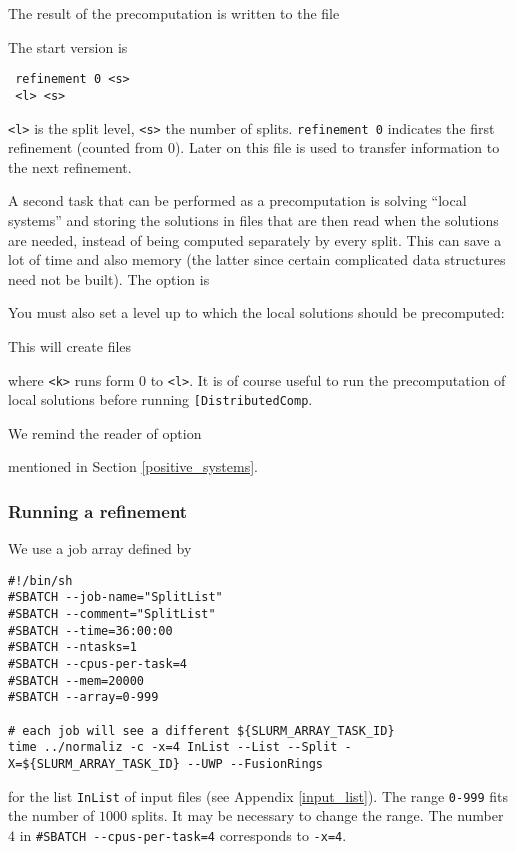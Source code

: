  The result of the precomputation is written to the file
 \begin{itemize}
 \end{itemize}
The start version is
 \begin{Verbatim}
 refinement 0 <s>
 <l> <s>
 \end{Verbatim}
 \verb*|<l>| is the split level, \verb*|<s>| the number of splits. \verb*|refinement 0| indicates the first refinement (counted from $0$). Later on this file is used to transfer information to the next refinement.

A second task that can be performed as a precomputation is solving ``local systems'' and storing the solutions in files that are then read when the solutions are needed, instead of being computed separately by every split. This can save a lot of time and also memory (the latter since certain complicated data structures need not be built). The option is
\begin{itemize}
\end{itemize}
You must also set a level up to which the local solutions should be precomputed:
\begin{itemize}
\end{itemize}
This will create files
\begin{itemize}
\end{itemize}
where \verb*|<k>| runs form $0$ to \verb*|<l>|. It is of course useful to run the precomputation of local solutions before running \verb*|[DistributedComp|.

We remind the reader of  option
\begin{itemize}
	\itemtt[ShortInt]
\end{itemize}
mentioned in Section \ref{positive_systems}.

\subsubsection {Running a refinement}

We use a job array defined by 
\begin{Verbatim}
#!/bin/sh
#SBATCH --job-name="SplitList"
#SBATCH --comment="SplitList"
#SBATCH --time=36:00:00
#SBATCH --ntasks=1
#SBATCH --cpus-per-task=4
#SBATCH --mem=20000
#SBATCH --array=0-999

# each job will see a different ${SLURM_ARRAY_TASK_ID}
time ../normaliz -c -x=4 InList --List --Split -X=${SLURM_ARRAY_TASK_ID} --UWP --FusionRings
\end{Verbatim}
for the  list \verb*|InList| of input files (see Appendix \ref{input_list}). The range \verb*|0-999| fits the number of $1000$ splits. It may be necessary to change the range. The number $4$ in \verb|#SBATCH --cpus-per-task=4| corresponds to \verb*|-x=4|.

